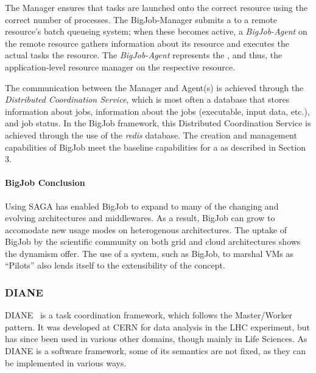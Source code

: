 \documentclass{sig-alternate}
\begin{document}
The Manager ensures that tasks are launched onto the correct resource
using the correct number of processes. The BigJob-Manager submits a
\pilot to a remote resource's batch queueing system; when these
\pilots becomes active, a \textit{BigJob-Agent} on the remote resource
gathers information about its resource
and executes the actual tasks the resource. The \textit{BigJob-Agent}
represents the \pilotjob, and thus, the application-level resource
manager on the respective resource.

The communication between the Manager and Agent(s) is achieved through
the {\it Distributed Coordination Service}, which is most often a
database that stores information about jobs, information about the
jobs (executable, input data, etc.), and job status. In the BigJob framework,
this Distributed Coordination Service is achieved through the use
of the \textit{redis} database.
The \pilot creation and management capabilities of BigJob meet
the baseline capabilities for a \pilotjob as described in Section 3.


\paragraph{BigJob Conclusion}
Using SAGA has enabled BigJob to expand to many of the changing and evolving
architectures and middlewares. As a result, BigJob can grow to accomodate
new usage modes on heterogenous architectures. The uptake
of BigJob by the scientific community
on both grid and cloud architectures shows the dynamism \pilotjobs offer.
The use of a \pilotjob system, such as BigJob, to marshal VMs as ``Pilots''
also lends itself to the extensibility of the \pilotjob concept.

\subsubsection{DIANE}


DIANE~\cite{Moscicki:908910} is a task coordination framework, which follows
the Master/Worker pattern.
It was developed at CERN for data analysis in the LHC experiment, but has since
been used in various other domains, though mainly in Life Sciences.
As DIANE is a software framework, some of its semantics are not fixed, as they
can be implemented in various ways.
\end{document}
